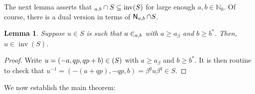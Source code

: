 \documentclass[reqno]{amsart}
\theoremstyle{plain}
\newtheorem{lem}{Lemma}[section]
\theoremstyle{definition}
\DeclareMathOperator{\inv}{inv}
\let\P\relax
\DeclareMathOperator{\P}{\textup{\textsf{P}}}
\DeclareMathOperator{\N}{\textup{\textsf{N}}}
\numberwithin{equation}{section}
\begin{document}
The next lemma asserts that $\P_{a,b}\cap S \subseteq \inv(S)$
for large enough $a,b\in\mathbb{N}_0$. Of course, there is a dual version in terms of $\N_{a,b}\cap S$.


\begin{lem}
\label{lem:LargeabInv}
Suppose $u\in S$ is such that $u\in \P_{a,b}$ with $a\geq a_\beta$ and $b\geq b^\ast$. Then, $u\in\inv(S)$.
\end{lem}

\begin{proof}
Write $u = (-a, qp, qp+b)\in \P(S)$ with $a\geq a_{\beta}$ and $b\geq b^\ast$. It is then routine to check that $u^{-1} = (-(a+qp), -qp, b) = \beta^qu\beta^q\in S$. 
\end{proof}





We now establish the main theorem:
\end{document}
